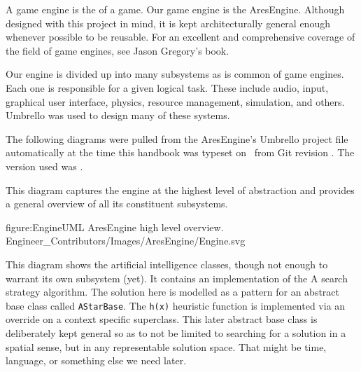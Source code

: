 

A game engine is the  of a game. Our game engine is the AresEngine. Although designed with this project in mind, it is kept architecturally general enough whenever possible to be reusable. For an excellent and comprehensive coverage of the field of game engines, see Jason Gregory's book.
    {}

Our engine is divided up into many subsystems as is common of game engines. Each one is responsible for a given logical task. These include audio, input, graphical user interface, physics, resource management, simulation, and others. Umbrello was used to design many of these systems.

The following diagrams were pulled from the AresEngine's Umbrello project file automatically at the time this handbook was typeset on \currentdate\ from Git revision \GitRevisionClickable. The version used was \UmbrelloVersion.

This diagram captures the engine at the highest level of abstraction and provides a general overview of all its constituent subsystems.

\FullPageDiagram
    {figure:EngineUML}
    {AresEngine high level overview.}
    {Engineer_Contributors/Images/AresEngine/Engine.svg}


This diagram shows the artificial intelligence classes, though not enough to warrant its own subsystem (yet). It contains an implementation of the A\high{*} search strategy algorithm. The solution here is modelled as a pattern for an abstract base class called {\tt AStarBase}. The {\tt h(x)} heuristic function is implemented via an override on a context specific superclass. This later abstract base class is deliberately kept general so as to not be limited to searching for a solution in a spatial sense, but in any representable solution space. That might be time, language, or something else we need later.

